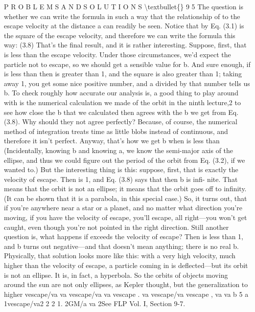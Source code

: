 \documentclass[10pt,oneside]{article}
\begin{document}
P R O B L E M S  A N D  S O L U T I O N S \textbackslash{}textbullet\{\} 9 5 The question is whether we can write the formula in such a way that the relationship of to the escape velocity at the distance a can readily be seen. Notice that by Eq. (3.1) is the square of the escape velocity, and therefore we can write the formula this way: (3.8) That’s the final result, and it is rather interesting. Suppose, first, that is less than the escape velocity. Under those circumstances, we’d expect the particle not to escape, so we should get a sensible value for b. And sure enough, if is less than then is greater than 1, and the square is also greater than 1; taking away 1, you get some nice positive number, and a divided by that number tells us b. To check roughly how accurate our analysis is, a good thing to play around with is the numerical calculation we made of the orbit in the ninth lecture,2 to see how close the b that we calculated then agrees with the b we get from Eq. (3.8). Why should they not agree perfectly? Because, of course, the numerical method of integration treats time as little blobs instead of continuous, and therefore it isn’t perfect. Anyway, that’s how we get b when is less than (Incidentally, knowing b and knowing a, we know the semi-major axis of the ellipse, and thus we could figure out the period of the orbit from Eq. (3.2), if we wanted to.) But the interesting thing is this: suppose, first, that is exactly the velocity of escape. Then is 1, and Eq. (3.8) says that then b is infi- nite. That means that the orbit is not an ellipse; it means that the orbit goes off to infinity. (It can be shown that it is a parabola, in this special case.) So, it turns out, that if you’re anywhere near a star or a planet, and no matter what direction you’re moving, if you have the velocity of escape, you’ll escape, all right---you won’t get caught, even though you’re not pointed in the right direction. Still another question is, what happens if exceeds the velocity of escape? Then is less than 1, and b turns out negative---and that doesn’t mean anything; there is no real b. Physically, that solution looks more like this: with a very high velocity, much higher than the velocity of escape, a particle coming in is deflected---but its orbit is not an ellipse. It is, in fact, a hyperbola. So the orbits of objects moving around the sun are not only ellipses, as Kepler thought, but the generalization to higher vescape/va va vescape/va va vescape . va vescape/va vescape , va va b 5 a 1vescape/va2 2 2 1. 2GM/a va 2See FLP Vol. I, Section 9-7.\par
\end{document}
